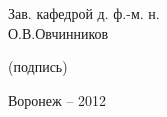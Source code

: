 \begin{titlepage}
\begin{flushright}

Зав. кафедрой д. ф.-м. н. \phantom{iiiiiii} \\

О.В.Овчинников \underline{\hspace{55mm}}

{\vspace{-4mm} \footnotesize (подпись)\/}


\end{flushright}

\vspace{25mm}
\begin{center}
Воронеж -- 2012
\end{center}

\end{titlepage}

\newpage
